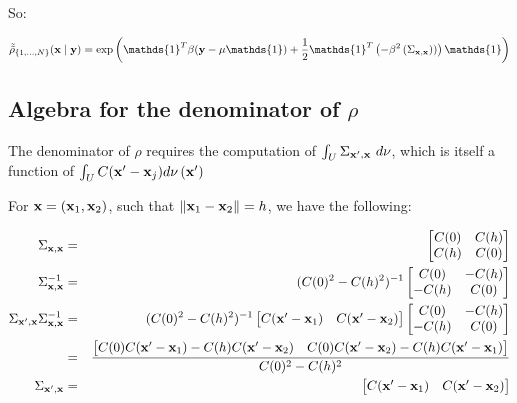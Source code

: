 So:

\begin{equation}
\tilde{\tilde{\intensityratio}}_{\{1,\ldots,N\}}(\position\mid\signal)=
\exp\left(\mathds{1}^T\beta(\signal-\mu\mathds{1})+
\frac12\mathds{1}^T\left(
-\beta^2\left(\provar_{\position,\position})\right)
\right)\mathds{1}\right)\label{eq:kjeojmcxzmxz}
\end{equation}



\subsection{Algebra for the denominator of $\rho$}

The denominator of $\rho$ requires the computation of $\int_{U}\Sigma_{\mathbf{x}',\mathbf{x}}~d\nu$, which is itself a function of
$\int_{U}C(\mathbf{x}'-\mathbf{x}_j)d\nu\left(\mathbf{x}'\right)$


For $\mathbf{x}=(\mathbf{x}_1,\mathbf{x}_2)$, such that $\|\mathbf{x}_1-\mathbf{x}_2\|=h$, we have the following:

\begin{eqnarray*}
\Sigma_{\mathbf{x},\mathbf{x}}&=&
    \begin{bmatrix}C(0)&C(h)\\C(h)&C(0)\end{bmatrix}\\
\Sigma_{\mathbf{x},\mathbf{x}}^{-1}&=&
    (C(0)^2-C(h)^2)^{-1}\begin{bmatrix}C(0)&-C(h)\\-C(h)&C(0)\end{bmatrix}\\
\Sigma_{\mathbf{x}',\mathbf{x}}\Sigma_{\mathbf{x},\mathbf{x}}^{-1}
    &=&(C(0)^2-C(h)^2)^{-1}
        \begin{bmatrix}C(\mathbf{x}'-\mathbf{x}_1)&C(\mathbf{x}'-\mathbf{x}_2)\end{bmatrix}\begin{bmatrix}C(0)&-C(h)\\-C(h)&C(0)\end{bmatrix}\\
    &=&\frac{\begin{bmatrix}
        C(0)C(\mathbf{x}'-\mathbf{x}_1)-C(h)C(\mathbf{x}'-\mathbf{x}_2)&              C(0)C(\mathbf{x}'-\mathbf{x}_2)-C(h)C(\mathbf{x}'-\mathbf{x}_1)\end{bmatrix}}{C(0)^2-C(h)^2}\\
\Sigma_{\mathbf{x}',\mathbf{x}}&=&\begin{bmatrix}C(\mathbf{x}'-\mathbf{x}_1)&C(\mathbf{x}'-\mathbf{x}_2)\end{bmatrix}
\end{eqnarray*}



